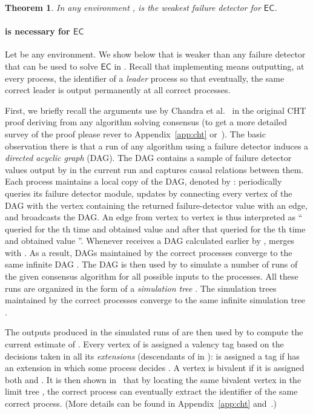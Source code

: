 \documentclass[11pt]{article}
\newtheorem{theorem}{Theorem}
\newcommand{\EC}{\ensuremath{\mathsf{EC}}}
\begin{document}
\begin{theorem}\label{th:WFDforEC}
In any environment ,  is the weakest failure detector for \EC.
\end{theorem}


\paragraph{ is necessary for \EC}
Let  be any environment.
We show below that  is weaker
than any failure detector  that can be used to solve {\EC} in .
Recall that implementing  means outputting, at every process,
        the identifier of a \emph{leader} process so that eventually,
         the same correct leader is output permanently at all correct
        processes.

First,  we briefly recall the arguments use by Chandra et al.~\cite{CHT96} in
the original CHT proof deriving  from any algorithm solving
consensus (to get a more detailed survey of the proof please rever
to Appendix~\ref{app:cht} or~\cite[Chapter 3]{fd-survey}).
The basic observation there is that
	a run of any algorithm using a failure detector
	induces a \emph{directed acyclic graph} (DAG).
The DAG contains a sample of failure detector values output by  in the current run
	and captures causal relations between them.
Each process  maintains  a local copy of the DAG, denoted by :
 periodically queries its failure detector module, updates 
by connecting every vertex of the DAG with the vertex containing the
returned failure-detector value with an edge, and broadcasts the DAG.
An edge from vertex  to vertex 
        is thus interpreted as `` queried  for the th time and
        obtained value  and after that  queried  for the
        th time and obtained value ''.
Whenever  receives a DAG  calculated earlier by , 
merges  with .
As a result, DAGs maintained by the correct processes converge to the same
infinite DAG .
The DAG  is then used by  to simulate a number of runs of
the given consensus algorithm  for all possible inputs to the processes.
All these  runs are organized in the form of a \emph{simulation
  tree} .
The simulation trees  maintained by the correct
processes converge to the same infinite simulation tree .

The outputs produced in the simulated runs of  are then used by 
to compute the current estimate of .
Every vertex  of  is assigned a valency tag based on the
decisions taken in all its \emph{extensions} (descendants of  in
):  is assigned a tag
 if   has an extension in which some process decides
.
A vertex is bivalent if it is assigned both  and .
It is then shown in~\cite{CHT96} that by locating the same bivalent vertex in the
limit tree , the correct process can eventually extract
the identifier of the same correct process.
(More details can be found in Appendix~\ref{app:cht} and~\cite{CHT96,fd-survey}.)
\end{document}
